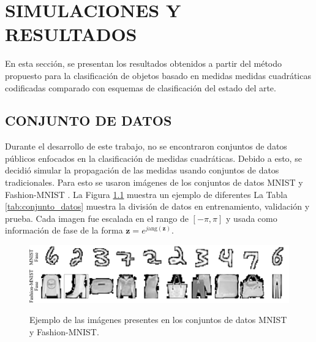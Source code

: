 
\chapter{SIMULACIONES Y RESULTADOS}

En esta sección, se presentan los resultados obtenidos a partir del método propuesto para la clasificación de objetos basado en medidas medidas cuadráticas codificadas comparado con esquemas de clasificación del estado del arte.

\section{CONJUNTO DE DATOS}

Durante el desarrollo de este trabajo, no se encontraron conjuntos de datos públicos enfocados en la clasificación de medidas cuadráticas. Debido a esto, se decidió simular la propagación de las medidas usando conjuntos de datos tradicionales. Para esto se usaron imágenes de los conjuntos de datos MNIST  y Fashion-MNIST . La Figura \ref{fig:conjunto_datos} muestra un ejemplo de diferentes La Tabla \ref{tab:conjunto_datos} muestra la división de datos en entrenamiento, validación y prueba. Cada imagen fue escalada en el rango de $[-\pi, \pi]$ y usada como información de fase de la forma $\mathbf{z}=e^{j\mathrm{ang}(\mathbf{z})}$.

\begin{figure}[!h]
    \centering
    \caption{Ejemplo de las imágenes presentes en los conjuntos de datos MNIST y Fashion-MNIST.}
    \includegraphics[width=\linewidth]{images/resultados/datasets.pdf}
    \label{fig:conjunto_datos}
\end{figure}


